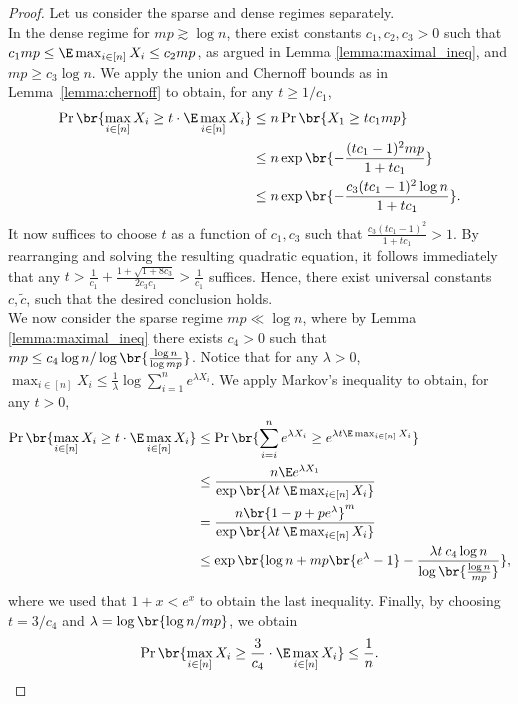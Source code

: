 \begin{proof}
    Let us consider the sparse and dense regimes separately. \\
    \noindent
    In the dense regime for $mp \gtrsim \log n$, there exist constants $c_1, c_2, c_3 > 0$ such that $c_1 mp \leq \E \max_{i \in [n]} X_i\leq c_2 mp$, as argued in Lemma  \ref{lemma:maximal_ineq}, and $mp\geq c_3\log n$. We apply the union and Chernoff bounds as in Lemma~\ref{lemma:chernoff} to obtain, for any $t \geq 1/c_1$,
    \begin{align*}
        \Pr \br{\max_{i \in [n]}X_i \geq t \cdot \E \max_{i\in [n]} X_i} &\leq n \Pr\br{X_1 \geq t c_1 mp} \\
        &\leq n \exp\br{-\frac{(tc_1-1)^2mp}{1+tc_1}} \\
        &\leq  n \exp\br{-\frac{c_3(tc_1-1)^2 \log n}{1+tc_1}}.
    \end{align*}
    It now suffices to choose $t$ as a function of $c_1, c_3$ such that $\frac{c_3(tc_1-1)^2 }{1+tc_1} > 1$. By rearranging and solving the resulting quadratic equation, it follows immediately that any $t > \frac{1}{c_1} + \frac{1+\sqrt{1+8c_3}}{2c_3c_1} > \frac{1}{c_1}$ suffices. Hence, there exist universal constants $c, \tilde{c}$, such that the desired conclusion holds. \\
    \noindent
    We now consider the sparse regime $mp \ll \log n$, where by Lemma  \ref{lemma:maximal_ineq} there exists $c_4 > 0$ such that $mp \leq c_4 \log n / \log \br{\frac{\log n}{\log mp}}$. Notice that for any $\lambda > 0$, $\max_{i \in [n]}X_i \leq \frac{1}{\lambda} \log \sum_{i = 1}^n e^{\lambda X_i}$. We apply Markov's inequality to obtain, for any $t > 0$,
    \begin{align*}
        \Pr\br{\max_{i \in [n]}X_i\geq t \cdot  \E \max_{i \in [n]}X_i}  & \leq \Pr\br{\sum_{i = i}^n e^{\lambda X_i} \geq e^{\lambda t \E \max_{i \in [n]}X_i}} \\
        & \leq \frac{n \E e^{\lambda  X_1}}{\exp\br{\lambda  t \: \E \max_{i\in  [n]}X_i}} \\
        & = \frac{n\br{1-p+pe^{\lambda}}^m}{\exp\br{\lambda  t \:  \E \max_{i\in  [n]}X_i}} \\
        & \leq \exp\br{\log n + mp\br{e^{\lambda}-1}-\frac{\lambda t \: c_4 \log n}{\log\br{\frac{\log n}{mp}}}},
    \end{align*}
    where we used that $1 + x < e^x$ to obtain the last inequality. Finally, by choosing $t = 3/c_4$ and $\lambda = \log\br{\log n / mp}$, we obtain
    \begin{align*}
        \Pr\br{\max_{i \in [n]}X_i\geq \frac{3}{c_4} \cdot  \E \max_{i \in [n]}X_i} \leq \frac{1}{n}.
    \end{align*}
\end{proof}

